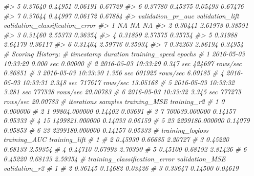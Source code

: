 \documentclass[]{book}
\newenvironment{Shaded}{\begin{snugshade}}{\end{snugshade}}
\newcommand{\CommentTok}[1]{\textcolor[rgb]{0.56,0.35,0.01}{\textit{#1}}}
\begin{document}
\begin{Shaded}
\begin{Highlighting}[]
\CommentTok{#> 5         0.37640            0.44951       0.06191        0.67729}
\CommentTok{#> 6         0.37780            0.45375       0.05493        0.67476}
\CommentTok{#> 7         0.37644            0.44997       0.06172        0.67884}
\CommentTok{#>   validation_pr_auc validation_lift validation_classification_error}
\CommentTok{#> 1                NA              NA                              NA}
\CommentTok{#> 2           0.30441         2.61978                         0.38591}
\CommentTok{#> 3           0.31460         2.55373                         0.36354}
\CommentTok{#> 4           0.31899         2.57575                         0.35754}
\CommentTok{#> 5           0.31988         2.64179                         0.36117}
\CommentTok{#> 6           0.31464         2.59776                         0.35934}
\CommentTok{#> 7           0.32263         2.86194                         0.34954}
\CommentTok{# Scoring History: }
\CommentTok{#   timestamp   duration  training_speed   epochs}
\CommentTok{# 1 2016-05-03 10:33:29  0.000 sec                  0.00000}
\CommentTok{# 2 2016-05-03 10:33:29  0.347 sec 424697 rows/sec  0.86851}
\CommentTok{# 3 2016-05-03 10:33:30  1.356 sec 601925 rows/sec  6.09185}
\CommentTok{# 4 2016-05-03 10:33:31  2.348 sec 717617 rows/sec 13.05168}
\CommentTok{# 5 2016-05-03 10:33:32  3.281 sec 777538 rows/sec 20.00783}
\CommentTok{# 6 2016-05-03 10:33:32  3.345 sec 777275 rows/sec 20.00783}
\CommentTok{# iterations        samples training_MSE training_r2}
\CommentTok{# 1          0       0.000000                         }
\CommentTok{# 2          1   99804.000000      0.14402     0.03691}
\CommentTok{# 3          7  700039.000000      0.14157     0.05333}
\CommentTok{# 4         15 1499821.000000      0.14033     0.06159}
\CommentTok{# 5         23 2299180.000000      0.14079     0.05853}
\CommentTok{# 6         23 2299180.000000      0.14157     0.05333}
\CommentTok{# training_logloss training_AUC training_lift}
\CommentTok{# 1                                            }
\CommentTok{# 2          0.45930      0.66685       2.20727}
\CommentTok{# 3          0.45220      0.68133       2.59354}
\CommentTok{# 4          0.44710      0.67993       2.70390}
\CommentTok{# 5          0.45100      0.68192       2.81426}
\CommentTok{# 6          0.45220      0.68133       2.59354}
\CommentTok{# training_classification_error validation_MSE validation_r2}
\CommentTok{# 1                                                           }
\CommentTok{# 2                       0.36145        0.14682       0.03426}
\CommentTok{# 3                       0.33647        0.14500       0.04619}

\end{Highlighting}
\end{Shaded}
\end{document}
